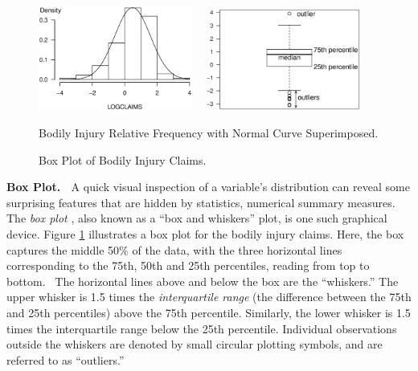 \begin{figure}[htp]
    \includegraphics[width=0.45\textwidth]
        {Chapter1/F1BIHist.eps} \hfill  $~~~$
               \includegraphics[width=0.45\textwidth]
        {Chapter1/F1BoxPlot.eps}

      \parbox[t]{2.5in}{\caption{\label{F1:BIHist} \small Bodily Injury Relative Frequency with Normal Curve
                Superimposed.}} \hfill
        \parbox[t]{2.5in}{\caption{\label{F1:BoxPlot} \small Box Plot of Bodily Injury
        Claims.}}
\end{figure}


\bigskip{}

\textbf{Box Plot. \ }A quick visual inspection of a variable's
distribution can reveal some surprising features that are hidden by
statistics, numerical summary measures. The \emph{box plot}
, also known as a ``box and whiskers'' plot, is one
such graphical device. Figure \ref{F1:BoxPlot} illustrates a box
plot for the bodily injury claims. Here, the box captures the middle
50\% of the data, with the three horizontal lines corresponding to
the 75th, 50th and 25th percentiles, reading from top to bottom. \
The horizontal lines above and below the box are the ``whiskers.''
The upper whisker is 1.5 times the \emph{interquartile range} (the
difference between the 75th and 25th percentiles) above the 75th
percentile. Similarly, the lower whisker is 1.5 times the
interquartile range below the 25th percentile. Individual
observations outside the whiskers are denoted by small circular
plotting symbols, and are referred to as ``outliers.''

\bigskip

